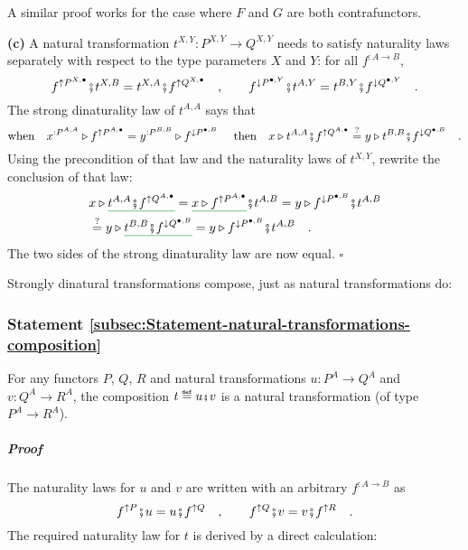 A similar proof works for the case where $F$ and $G$ are both contrafunctors.

\textbf{(c)} A natural transformation $t^{X,Y}:P^{X,Y}\rightarrow Q^{X,Y}$
needs to satisfy naturality laws separately with respect to the type
parameters $X$ and $Y$: for all $f^{:A\rightarrow B}$,
\[
f^{\uparrow P^{X,\bullet}}\bef t^{X,B}=t^{X,A}\bef f^{\uparrow Q^{X,\bullet}}\quad,\quad\quad f^{\downarrow P^{\bullet,Y}}\bef t^{A,Y}=t^{B,Y}\bef f^{\downarrow Q^{\bullet,Y}}\quad.
\]
The strong dinaturality law of $t^{A,A}$ says that
\[
\text{when}\quad x^{:P^{A,A}}\triangleright f^{\uparrow P^{A,\bullet}}=y^{:P^{B,B}}\triangleright f^{\downarrow P^{\bullet,B}}\quad\text{ then}\quad x\triangleright t^{A,A}\bef f^{\uparrow Q^{A,\bullet}}\overset{?}{=}y\triangleright t^{B,B}\bef f^{\downarrow Q^{\bullet,B}}\quad.
\]
Using the precondition of that law and the naturality laws of $t^{X,Y}$,
rewrite the conclusion of that law:
\begin{align*}
 & x\triangleright\gunderline{t^{A,A}\bef f^{\uparrow Q^{A,\bullet}}}=\gunderline{x\triangleright f^{\uparrow P^{A,\bullet}}}\bef t^{A,B}=y\triangleright f^{\downarrow P^{\bullet,B}}\bef t^{A,B}\\
 & \overset{?}{=}y\triangleright\gunderline{t^{B,B}\bef f^{\downarrow Q^{\bullet,B}}}=y\triangleright f^{\downarrow P^{\bullet,B}}\bef t^{A,B}\quad.
\end{align*}
The two sides of the strong dinaturality law are now equal. $\square$

Strongly dinatural transformations compose, just as natural transformations
do:

\subsubsection{Statement \label{subsec:Statement-natural-transformations-composition}\ref{subsec:Statement-natural-transformations-composition}}

For any functors $P$, $Q$, $R$ and natural transformations $u:P^{A}\rightarrow Q^{A}$
and $v:Q^{A}\rightarrow R^{A}$, the composition $t\triangleq u\bef v$
is a natural transformation (of type $P^{A}\rightarrow R^{A}$).

\subparagraph{Proof}

The naturality laws for $u$ and $v$ are written with an arbitrary
$f^{:A\rightarrow B}$ as
\[
f^{\uparrow P}\bef u=u\bef f^{\uparrow Q}\quad,\quad\quad f^{\uparrow Q}\bef v=v\bef f^{\uparrow R}\quad.
\]
The required naturality law for $t$ is derived by a direct calculation:


